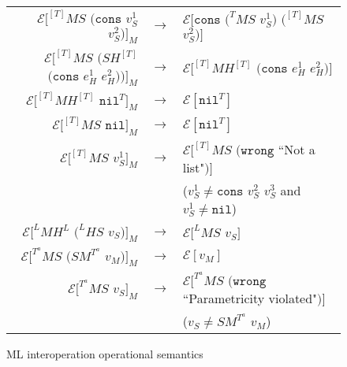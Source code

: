 \begin{figure}
\begin{center}
\begin{tabular}{rcl}
$\mathscr{E}[^{[T]}MS$ $(\mathtt{cons}$ $v_{S}^{1}$ $v_{S}^{2})]_{M}$ & $\rightarrow$ & $\mathscr{E}[\mathtt{cons}$ $(^{T}MS$ $v_{S}^{1})$ $(^{[T]}MS$ $v_{S}^{2})]$ \\
$\mathscr{E}[^{[T]}MS$ $(SH^{[T]}$ $(\mathtt{cons}$ $e_{H}^{1}$ $e_{H}^{2}))]_{M}$ & $\rightarrow$ & $\mathscr{E}[^{[T]}MH^{[T]}$ $(\mathtt{cons}$ $e_{H}^{1}$ $e_{H}^{2})]$ \\
$\mathscr{E}[^{[T]}MH^{[T]}$ $\mathtt{nil}^{T}]_{M}$ & $\rightarrow$ & $\mathscr{E}[\mathtt{nil}^{T}]$ \\
$\mathscr{E}[^{[T]}MS$ $\mathtt{nil}]_{M}$ & $\rightarrow$ & $\mathscr{E}[\mathtt{nil}^{T}]$ \\
$\mathscr{E}[^{[T]}MS$ $v_{S}^{1}]_{M}$ & $\rightarrow$ & $\mathscr{E}[^{[T]}MS$ $(\mathtt{wrong}$ ``Not a list"$)]$ \\
&& ($v_{S}^{1}\neq\mathtt{cons}$ $v_{S}^{2}$ $v_{S}^{3}$ and $v_{S}^{1}\neq\mathtt{nil}$) \\
$\mathscr{E}[^{L}MH^{L}$ $(^{L}HS$ $v_{S})]_{M}$ & $\rightarrow$ & $\mathscr{E}[^{L}MS$ $v_{S}]$ \\
$\mathscr{E}[^{T^{a}}MS$ $(SM^{T^{a}}$ $v_{M})]_{M}$ & $\rightarrow$ & $\mathscr{E}[v_{M}]$ \\
$\mathscr{E}[^{T^{a}}MS$ $v_{S}]_{M}$ & $\rightarrow$ & $\mathscr{E}[^{T^{a}}MS$ $(\mathtt{wrong}$ ``Parametricity violated"$)]$ \\
&& ($v_{S}\neq SM^{T^{a}}$ $v_{M}$)
\end{tabular}
\end{center}
\caption{ML interoperation operational semantics}
\label{fig:mios}
\end{figure}